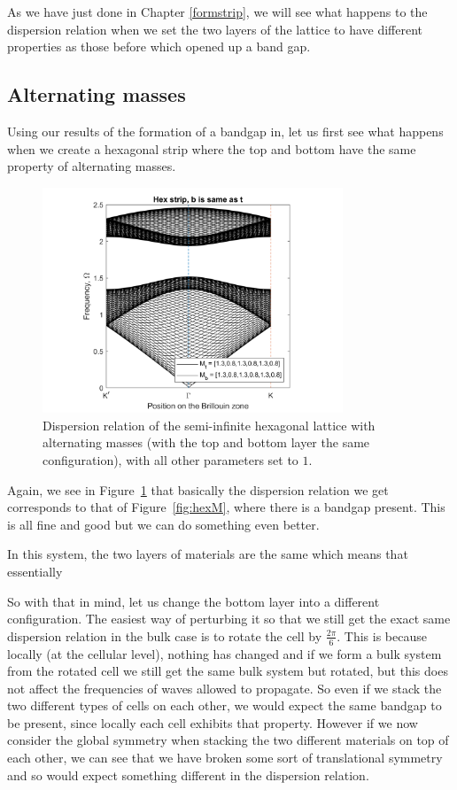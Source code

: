 As we have just done in Chapter \ref{formstrip}, we will see what happens to
the dispersion relation when we set the two layers of the lattice to have
different properties as those before which opened up a band gap.

\subsection{Alternating masses}
\label{perturbaltmass}
Using our results of the formation of a bandgap in, let us first see what
happens when we create a hexagonal strip where the top and bottom have the same
property of alternating masses. 

\begin{figure}[!h]
\centering
\includegraphics[width=0.8\textwidth]{imgs/hexstripperturbM.png}
\caption{\label{fig:hexstripM} Dispersion relation of the semi-infinite
  hexagonal lattice with alternating masses (with the top and bottom layer the
  same configuration), with all other parameters set to $1$.}
\end{figure}

Again, we see in Figure~\ref{fig:hexstripM} that basically the dispersion
relation we get corresponds to that of Figure~\ref{fig:hexM}, where there is a
bandgap present. This is all fine and good but we can do something even better.

In this system, the two layers of materials are the same which means that
essentially

So with that in mind, let us change the bottom layer into a different
configuration. The easiest way of perturbing it so that we still get the exact
same dispersion relation in the bulk case is to rotate the cell by
$\frac{2\pi}{6}$. This is because locally (at the cellular level), nothing has
changed and if we form a bulk system from the rotated cell we still get the
same bulk system but rotated, but this does not affect the frequencies of waves
allowed to propagate. So even if we stack the two different types of cells on
each other, we would expect the same bandgap to be present, since locally each
cell exhibits that property. However if we now consider the global symmetry
when stacking the two different materials on top of each other, we can see that
we have broken some sort of translational symmetry and so would expect
something different in the dispersion relation.

